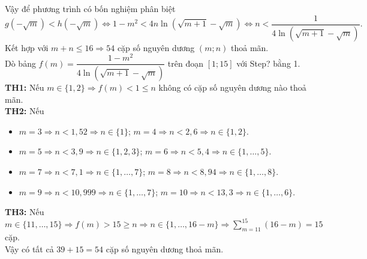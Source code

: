 \begin{ex}
{\begin{center}
		\end{center}
		Vậy để phương trình có bốn nghiệm phân biệt $$g(-\sqrt{m})<h(-\sqrt{m}) \Leftrightarrow 1-m^2<4 n \ln (\sqrt{m+1}-\sqrt{m}) \Leftrightarrow n<\dfrac{1}{4 \ln (\sqrt{m+1}-\sqrt{m})}.$$
		Kết hợp với $m+n \leq 16 \Rightarrow 54$ cặp số nguyên dương $(m ; n)$ thoả mãn. \\
		Dò bảng $f(m)=\dfrac{1-m^2}{4 \ln (\sqrt{m+1}-\sqrt{m})}$ trên đoạn $[1 ; 15]$ với Step? bằng 1.\\
		\textbf{TH1:} Nếu $m \in\{1,2\} \Rightarrow f(m)<1 \leq n$ không có cặp số nguyên dương nào thoả mãn.\\
		\textbf{TH2:} Nếu
		\begin{itemize}
			\item $ m=3 \Rightarrow n<1{,}52 \Rightarrow n \in\{1\}$; $m=4 \Rightarrow n<2{,}6 \Rightarrow n \in\{1,2\} $.
			\item $ m=5 \Rightarrow n<3{,}9 \Rightarrow n \in\{1,2,3\} $; $m=6 \Rightarrow n<5{,}4 \Rightarrow n \in\{1, \ldots, 5\} $.
			\item $ m=7 \Rightarrow n<7{,}1 \Rightarrow n \in\{1, \ldots, 7\} $; $m=8 \Rightarrow n<8{,}94 \Rightarrow n \in\{1, \ldots, 8\} $.
			\item $ m=9 \Rightarrow n<10{,}999 \Rightarrow n \in\{1, \ldots, 7\} $; $m=10 \Rightarrow n<13{,}3 \Rightarrow n \in\{1, \ldots, 6\} $.
		\end{itemize}
		\textbf{TH3:} Nếu $ m \in\{11, \ldots, 15\} \Rightarrow f(m)>15 \geq n \Rightarrow n \in\{1, \ldots, 16-m\} \Rightarrow \displaystyle \sum\limits_{m=11}^{15}(16-m)=15$  cặp.\\
		Vậy có tất cả $39+15=54$ cặp số nguyên dương thoả mãn.
	}
\end{ex}

